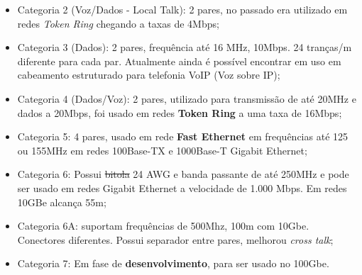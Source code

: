 \documentclass[answers]{exam}
\begin{document}
\begin{questions}
{\begin{itemize}
				\item Categoria 2 (Voz/Dados - Local Talk): 2 pares, no passado era utilizado em redes \textit{Token Ring} chegando a taxas de 4Mbps;
				\item Categoria 3 (Dados): 2 pares, frequência até 16 MHz, 10Mbps. 24 tranças/m diferente para cada par. Atualmente ainda é possível encontrar em uso em cabeamento estruturado para telefonia VoIP (Voz sobre IP);
				\item Categoria 4 (Dados/Voz): 2 pares, utilizado para transmissão de até 20MHz e dados a 20Mbps, foi usado em redes \textbf{Token Ring} a uma taxa de 16Mbps;
				\item Categoria 5: 4 pares, usado em rede \textbf{Fast Ethernet} em frequências até 125 ou 155MHz em redes 100Base-TX e 1000Base-T Gigabit Ethernet;
				\item Categoria 6: Possui \sout{bitola} 24 AWG e banda passante de até 250MHz e pode ser usado em redes Gigabit Ethernet a velocidade de 1.000 Mbps. Em redes 10GBe alcança 55m;
				\item Categoria 6A: suportam frequências de 500Mhz, 100m com 10Gbe. Conectores diferentes. Possui separador entre pares, melhorou \textit{cross talk};
				\item Categoria 7: Em fase de \textbf{desenvolvimento}, para ser usado no 100Gbe.
			\end{itemize}					
		}
	\end{questions}
\end{document}
